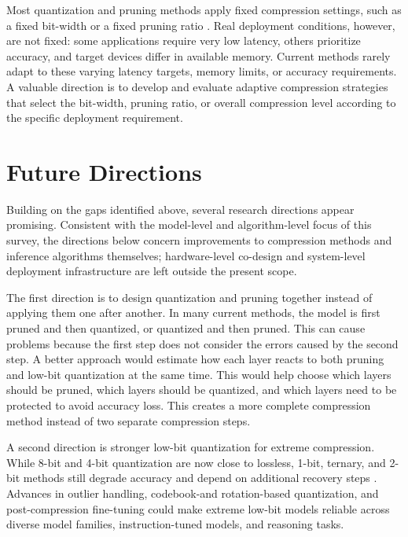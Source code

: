 \documentclass[
11pt, %
english, %
singlespacing, %
headsepline, %
]{MastersDoctoralThesis} %
\begin{document}
Most quantization and pruning methods apply fixed compression settings, such as a fixed bit-width or a fixed pruning ratio \cite{cho2025sub4bit}. Real deployment conditions, however, are not fixed: some applications require very low latency, others prioritize accuracy, and target devices differ in available memory. Current methods rarely adapt to these varying latency targets, memory limits, or accuracy requirements. A valuable direction is to develop and evaluate adaptive compression strategies that select the bit-width, pruning ratio, or overall compression level according to the specific deployment requirement.

\section{Future Directions}
\label{sec:lr-future}

Building on the gaps identified above, several research directions appear promising. Consistent with the model-level and algorithm-level focus of this survey, the directions below concern improvements to compression methods and inference algorithms themselves; hardware-level co-design and system-level deployment infrastructure are left outside the present scope.

The first direction is to design quantization and pruning together instead of applying them one after another. In many current methods, the model is first pruned and then quantized, or quantized and then pruned. This can cause problems because the first step does not consider the errors caused by the second step. A better approach would estimate how each layer reacts to both pruning and low-bit quantization at the same time. This would help choose which layers should be pruned, which layers should be quantized, and which layers need to be protected to avoid accuracy loss. This creates a more complete compression method instead of two separate compression steps.

A second direction is stronger low-bit quantization for extreme compression. While 8-bit and 4-bit quantization are now close to lossless, 1-bit, ternary, and 2-bit methods still degrade accuracy and depend on additional recovery steps \cite{survey2025ptbitnet,huang2024billm,shang2023pbllm}. Advances in outlier handling, codebook-and rotation-based quantization, and post-compression fine-tuning \cite{chen2025efficientqat,malinovskii2024pvtuning} could make extreme low-bit models reliable across diverse model families, instruction-tuned models, and reasoning tasks.
\end{document}
